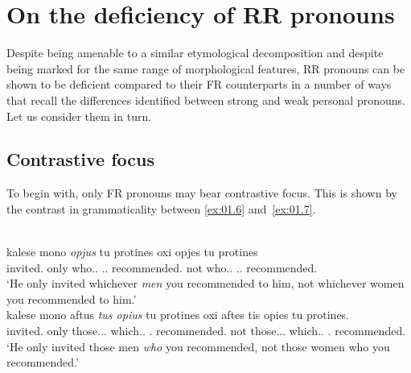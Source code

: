 \documentclass[output=paper]{langsci/langscibook}
\begin{document}
\section{On the deficiency of RR pronouns}\label{sec:01.3}

Despite being amenable to a similar etymological decomposition and despite
being marked for the same range of morphological features, \gls{RR} pronouns
can be shown to be deficient compared to their \gls{FR} counterparts in a
number of ways that recall the differences identified between strong and weak
personal pronouns. Let us consider them in turn.

\subsection{Contrastive focus}
To begin with, only \gls{FR}
pronouns may bear contrastive
focus. This is shown by the contrast in
grammaticality between \eqref{ex:01.6} and~\eqref{ex:01.7}.

\ea {}\label{ex:01.6}\\
	\gll kalese mono \emph{opjus} tu protines oxi opjes tu protines\\
		invited.\Tsg{} only who.\M{}.\Pl{} \Cl.\Tsg.\M{} recommended.\Ssg{} not who.\glossF.\Pl{} \Cl.\Tsg.\M{} recommended.\Ssg{}\\
	\glt \enquote*{He only invited whichever \emph{men} you recommended to him, not whichever women you recommended to him.}
\ex {}\label{ex:01.7}\\
    \gll \llap{*}kalese mono aftus \emph{tus opius} tu protines oxi aftes {tis opies} tu protines.\\
    invited.\Tsg{} only those.\M.\Pl.\Acc{} which.\M.\Pl{} \Cl.\Tsg{}
    recommended.\Ssg{} not those.\glossF.\Pl.\Acc{} which.\glossF.\Pl{} \Cl.\Tsg{} recommended.\Ssg{}\\
    \glt *\enquote*{He only invited those men \emph{who} you recommended, not
    those women who you recommended.}
\z
\end{document}
